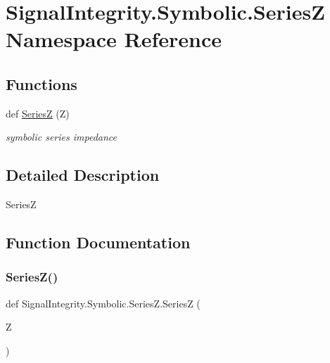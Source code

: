 \hypertarget{namespaceSignalIntegrity_1_1Symbolic_1_1SeriesZ}{}\section{Signal\+Integrity.\+Symbolic.\+SeriesZ Namespace Reference}
\label{namespaceSignalIntegrity_1_1Symbolic_1_1SeriesZ}
\subsection*{Functions}
\begin{DoxyCompactItemize}
\item 
def \hyperlink{namespaceSignalIntegrity_1_1Symbolic_1_1SeriesZ_a92ca1fd303a14c035ca94346df9cc48b}{SeriesZ} (Z)
\begin{DoxyCompactList}\small\item\em symbolic series impedance \end{DoxyCompactList}\end{DoxyCompactItemize}


\subsection{Detailed Description}
\begin{DoxyVerb}SeriesZ\end{DoxyVerb}
 

\subsection{Function Documentation}
\mbox{\label{namespaceSignalIntegrity_1_1Symbolic_1_1SeriesZ_a92ca1fd303a14c035ca94346df9cc48b}} 
\subsubsection{\texorpdfstring{Series\+Z()}{SeriesZ()}}
{\footnotesize\ttfamily def Signal\+Integrity.\+Symbolic.\+Series\+Z.\+SeriesZ (\begin{DoxyParamCaption}\item[{}]{Z }\end{DoxyParamCaption})}



